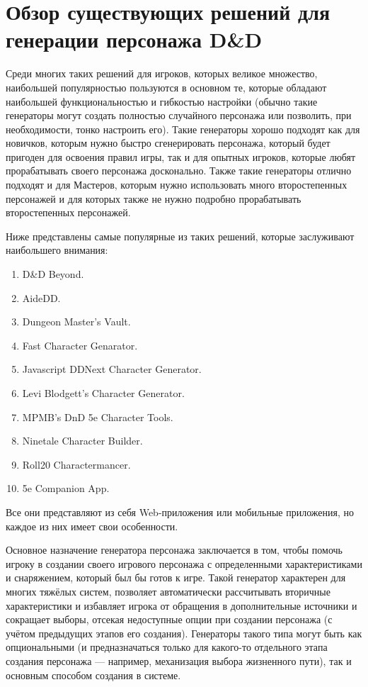 \chapter{Обзор существующих решений для генерации персонажа D\&D}

Среди многих таких решений для игроков, которых великое множество, наибольшей популярностью пользуются в основном те, которые обладают наибольшей функциональностью и гибкостью настройки (обычно такие генераторы могут создать полностью случайного персонажа или позволить, при необходимости, тонко настроить его). Такие генераторы хорошо подходят как для новичков, которым нужно быстро сгенерировать персонажа, который будет пригоден для освоения правил игры, так и для опытных игроков, которые любят прорабатывать своего персонажа досконально. Также такие генераторы отлично подходят и для Мастеров, которым нужно использовать много второстепенных персонажей и для которых также не нужно подробно прорабатывать второстепенных персонажей.

Ниже представлены самые популярные из таких решений, которые заслуживают наибольшего внимания:

\begin{enumerate}
    \item D\&D Beyond.
    \item AideDD.
    \item Dungeon Master’s Vault.
    \item Fast Character Genarator.
    \item Javascript DDNext Character Generator.
    \item Levi Blodgett’s Character Generator.
    \item MPMB’s DnD 5e Character Tools.
    \item Ninetale Character Builder.
    \item Roll20 Charactermancer.
    \item 5e Companion App.
\end{enumerate}

Все они представляют из себя Web-приложения или мобильные приложения, но каждое из них имеет свои особенности.

Основное назначение генератора персонажа заключается в том, чтобы помочь игроку в создании своего игрового персонажа с определенными характеристиками и снаряжением, который был бы готов к игре. Такой генератор характерен для многих тяжёлых систем, позволяет автоматически рассчитывать вторичные характеристики и избавляет игрока от обращения в дополнительные источники и сокращает выборы, отсекая недоступные опции при создании персонажа (с учётом предыдущих этапов его создания). Генераторы такого типа могут быть как опциональными (и предназначаться только для какого-то отдельного этапа создания персонажа --- например, механизация выбора жизненного пути), так и основным способом создания в системе.

